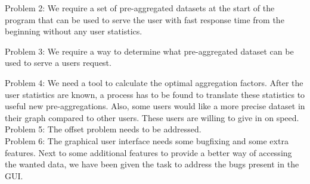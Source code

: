 Problem 2: We require a set of pre-aggregated datasets at the start of the program that can be used to serve the user with fast response time from the beginning without any user statistics.

Problem 3: We require a way to determine what pre-aggregated dataset can be used to serve a users request.


Problem 4: We need a tool to calculate the optimal aggregation factors.
After the user statistics are known, a process has to be found to translate these statistics to useful new pre-aggregations. Also, some users would like a more precise dataset in their graph compared to other users. These users are willing to give in on speed.\\

Problem 5: The offset problem needs to be addressed.\\

Problem 6: The graphical user interface needs some bugfixing and some extra features.
Next to some additional features to provide a better way of accessing the wanted data, we have been given the task to address the bugs present in the GUI.
